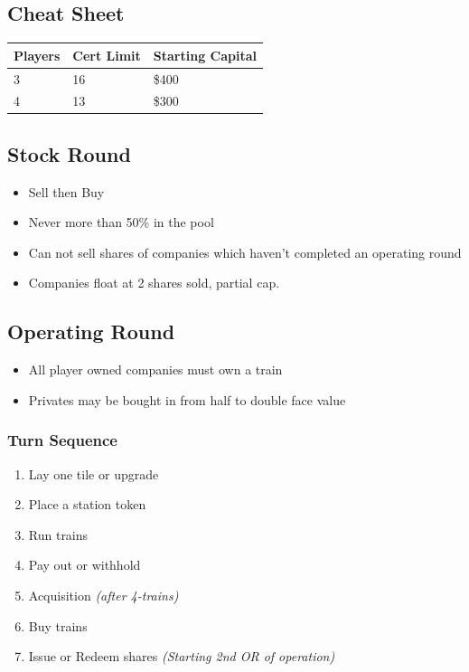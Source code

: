 \documentclass[letterpaper]{article}
\begin{document}
\thispagestyle{empty}
\begin{multicols}{2}
    \section*{Cheat Sheet}
    \begin{tabular}{l|l|l}
      \hline
      \textbf{Players} & \textbf{Cert Limit} & \textbf{Starting Capital} \\
      \hline
      \hline
      3 & 16 & \$400 \\
      4 & 13 & \$300 \\
      \hline
    \end{tabular}
    \subsection*{Stock Round}
    \begin{itemize}
    \item Sell then Buy
    \item Never more than 50\% in the pool
    \item Can not sell shares of companies which haven't completed an operating round
    \item Companies float at 2 shares sold, partial cap.
    \end{itemize}
    \subsection*{Operating Round}

    \begin{itemize}
    \item All player owned companies must own a train
    \item Privates may be bought in from half to double face value
    \end{itemize}

    \subsubsection*{Turn Sequence}
    \begin{enumerate}
    \item Lay one tile or upgrade
    \item Place a station token
    \item Run trains
    \item Pay out or withhold
    \item Acquisition \textit{(after 4-trains)}
    \item Buy trains
    \item Issue or Redeem shares \textit{(Starting 2nd OR of operation)}
    \end{enumerate}


\end{multicols}
\end{document}
